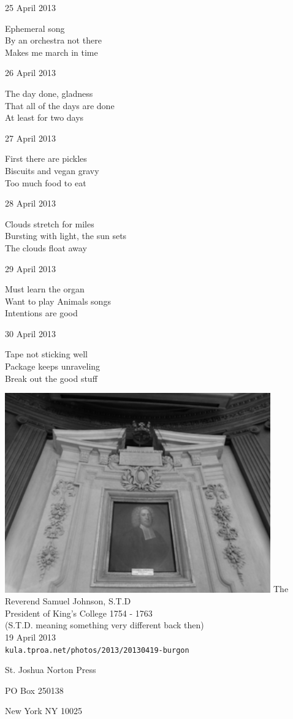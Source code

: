 \documentclass[12pt]{article}
\begin{document}
25 April 2013

Ephemeral song \\
By an orchestra not there \\
Makes me march in time

26 April 2013

The day done, gladness \\
That all of the days are done \\
At least for two days

27 April 2013

First there are pickles \\
Biscuits and vegan gravy \\
Too much food to eat

28 April 2013

Clouds stretch for miles \\
Bursting with light, the sun sets \\
The clouds float away

29 April 2013

Must learn the organ \\
Want to play Animals songs \\
Intentions are good

30 April 2013

Tape not sticking well \\
Package keeps unraveling \\
Break out the good stuff


\newpage

\begin{center}
\includegraphics[width=325pt]{burgon.png}
The Reverend Samuel Johnson, S.T.D \\
President of King's College 1754 - 1763 \\
(S.T.D. meaning something very different back then)\\
19 April 2013 \\
{\tt kula.tproa.net/photos/2013/20130419-burgon}
\end{center}

\newpage

\thispagestyle{empty}
\vspace*{12cm}
\begin{sideways}
\Large{St. Joshua Norton Press}
\end{sideways}
\begin{sideways}
\Large{PO Box 250138}
\end{sideways}
\begin{sideways}
\Large{New York NY 10025}
\end{sideways}
\end{document}
